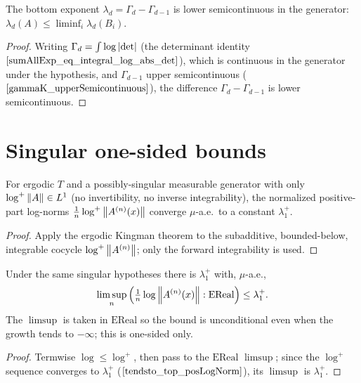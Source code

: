 \begin{theorem}\label{botExp_lowerSemicontinuous}
  \leanok
  The bottom exponent $\lambda_d = \Gamma_d - \Gamma_{d-1}$ is lower semicontinuous in the generator: $\lambda_d(A) \le \liminf_i \lambda_d(B_i)$.
\end{theorem}
\begin{proof}\leanok
  Writing $\Gamma_d = \int\log\left\lvert \det \right\rvert$ (the determinant identity $\ref{sumAllExp_eq_integral_log_abs_det}$), which is continuous in the generator under the hypothesis, and $\Gamma_{d-1}$ upper semicontinuous ($\ref{gammaK_upperSemicontinuous}$), the difference $\Gamma_d - \Gamma_{d-1}$ is lower semicontinuous.
\end{proof}

\section{Singular one-sided bounds}

\begin{theorem}\label{tendsto_top_posLogNorm}
  \leanok
  For ergodic $T$ and a possibly-singular measurable generator with only $\log^+\left\lVert A \right\rVert \in L^1$ (no invertibility, no inverse integrability), the normalized positive-part log-norms $\tfrac1n\log^+\left\lVert A^{(n)}(x) \right\rVert$ converge $\mu$-a.e.\ to a constant $\lambda_1^+$.
\end{theorem}
\begin{proof}\leanok
  Apply the ergodic Kingman theorem to the subadditive, bounded-below, integrable cocycle $\log^+\left\lVert A^{(n)} \right\rVert$; only the forward integrability is used.
\end{proof}

\begin{theorem}\label{limsup_logNorm_le_top}
  \leanok
  Under the same singular hypotheses there is $\lambda_1^+$ with, $\mu$-a.e.,
  \[ \limsup_n\Big(\tfrac1n\log\left\lVert A^{(n)}(x) \right\rVert : \mathrm{EReal}\Big) \le \lambda_1^+. \]
  The $\limsup$ is taken in $\mathrm{EReal}$ so the bound is unconditional even when the growth tends to $-\infty$; this is one-sided only.
\end{theorem}
\begin{proof}\leanok
  Termwise $\log \le \log^+$, then pass to the $\mathrm{EReal}$ $\limsup$; since the $\log^+$ sequence converges to $\lambda_1^+$ ($\ref{tendsto_top_posLogNorm}$), its $\limsup$ is $\lambda_1^+$.
\end{proof}

